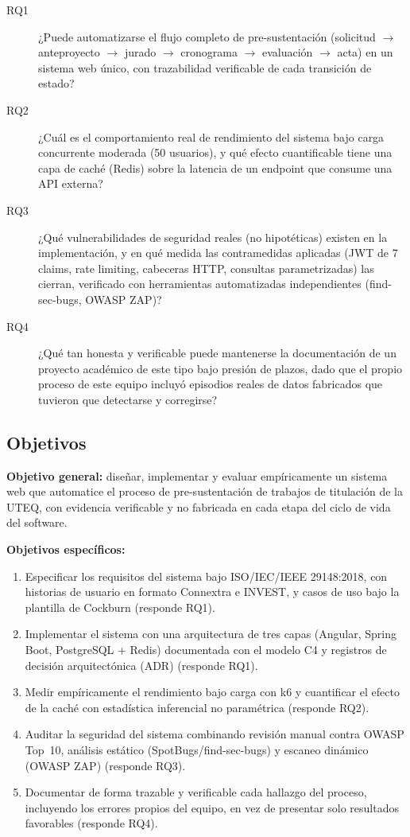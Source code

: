 \begin{description}
    \item[RQ1] ¿Puede automatizarse el flujo completo de pre-sustentación (solicitud $\rightarrow$
    anteproyecto $\rightarrow$ jurado $\rightarrow$ cronograma $\rightarrow$ evaluación $\rightarrow$
    acta) en un sistema web único, con trazabilidad verificable de cada transición de estado?
    \item[RQ2] ¿Cuál es el comportamiento real de rendimiento del sistema bajo carga concurrente
    moderada (50 usuarios), y qué efecto cuantificable tiene una capa de caché (Redis) sobre la latencia
    de un endpoint que consume una API externa?
    \item[RQ3] ¿Qué vulnerabilidades de seguridad reales (no hipotéticas) existen en la implementación,
    y en qué medida las contramedidas aplicadas (JWT de 7 claims, rate limiting, cabeceras HTTP,
    consultas parametrizadas) las cierran, verificado con herramientas automatizadas independientes
    (find-sec-bugs, OWASP ZAP)?
    \item[RQ4] ¿Qué tan honesta y verificable puede mantenerse la documentación de un proyecto académico
    de este tipo bajo presión de plazos, dado que el propio proceso de este equipo incluyó episodios
    reales de datos fabricados que tuvieron que detectarse y corregirse?
\end{description}

\subsection{Objetivos}

\textbf{Objetivo general:} diseñar, implementar y evaluar empíricamente un sistema web que automatice el
proceso de pre-sustentación de trabajos de titulación de la UTEQ, con evidencia verificable y no
fabricada en cada etapa del ciclo de vida del software.

\textbf{Objetivos específicos:}
\begin{enumerate}[nosep]
    \item Especificar los requisitos del sistema bajo ISO/IEC/IEEE 29148:2018, con historias de usuario
    en formato Connextra e INVEST, y casos de uso bajo la plantilla de Cockburn (responde RQ1).
    \item Implementar el sistema con una arquitectura de tres capas (Angular, Spring Boot, PostgreSQL +
    Redis) documentada con el modelo C4 y registros de decisión arquitectónica (ADR) (responde RQ1).
    \item Medir empíricamente el rendimiento bajo carga con k6 y cuantificar el efecto de la caché con
    estadística inferencial no paramétrica (responde RQ2).
    \item Auditar la seguridad del sistema combinando revisión manual contra OWASP Top~10, análisis
    estático (SpotBugs/find-sec-bugs) y escaneo dinámico (OWASP ZAP) (responde RQ3).
    \item Documentar de forma trazable y verificable cada hallazgo del proceso, incluyendo los errores
    propios del equipo, en vez de presentar solo resultados favorables (responde RQ4).
\end{enumerate}


